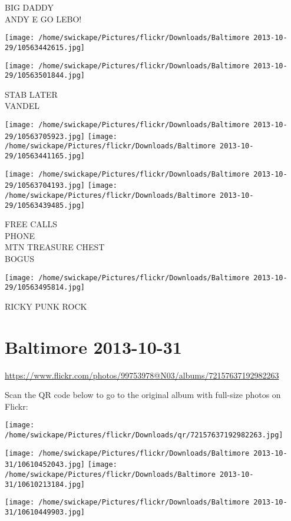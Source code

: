 \documentclass[10pt,letterpaper]{article}
\begin{document}
BIG DADDY\\
ANDY E GO LEBO!
\pagebreak

\texttt{[image: /home/swickape/Pictures/flickr/Downloads/Baltimore 2013-10-29/10563442615.jpg]}

\vspace{0.25in}
\texttt{[image: /home/swickape/Pictures/flickr/Downloads/Baltimore 2013-10-29/10563501844.jpg]}

STAB LATER\\
VANDEL
\pagebreak

\texttt{[image: /home/swickape/Pictures/flickr/Downloads/Baltimore 2013-10-29/10563705923.jpg]}
\texttt{[image: /home/swickape/Pictures/flickr/Downloads/Baltimore 2013-10-29/10563441165.jpg]}

\texttt{[image: /home/swickape/Pictures/flickr/Downloads/Baltimore 2013-10-29/10563704193.jpg]}
\texttt{[image: /home/swickape/Pictures/flickr/Downloads/Baltimore 2013-10-29/10563439485.jpg]}

FREE CALLS\\
PHONE\\
MTN TREASURE CHEST\\
BOGUS
\pagebreak

\texttt{[image: /home/swickape/Pictures/flickr/Downloads/Baltimore 2013-10-29/10563495814.jpg]}

RICKY PUNK ROCK
\pagebreak

\section*{Baltimore 2013-10-31}

\url{https://www.flickr.com/photos/99753978@N03/albums/72157637192982263}

Scan the QR code below to go to the original album with full-size photos on Flickr:

\texttt{[image: /home/swickape/Pictures/flickr/Downloads/qr/72157637192982263.jpg]}
\pagebreak

\texttt{[image: /home/swickape/Pictures/flickr/Downloads/Baltimore 2013-10-31/10610452043.jpg]}
\texttt{[image: /home/swickape/Pictures/flickr/Downloads/Baltimore 2013-10-31/10610213184.jpg]}

\texttt{[image: /home/swickape/Pictures/flickr/Downloads/Baltimore 2013-10-31/10610449903.jpg]}
\end{document}
